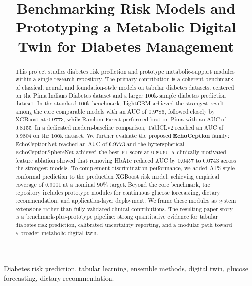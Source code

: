 \documentclass[conference]{IEEEtran}
\begin{document}
\title{Benchmarking Risk Models and Prototyping a Metabolic Digital Twin for Diabetes Management}

\author{
}

\maketitle

\begin{abstract}
This project studies diabetes risk prediction and prototype metabolic-support modules within a single research repository. The primary contribution is a coherent benchmark of classical, neural, and foundation-style models on tabular diabetes datasets, centered on the Pima Indians Diabetes dataset and a larger 100k-sample diabetes prediction dataset. In the standard 100k benchmark, LightGBM achieved the strongest result among the core comparable models with an AUC of 0.9786, followed closely by XGBoost at 0.9773, while Random Forest performed best on Pima with an AUC of 0.8155. In a dedicated modern-baseline comparison, TabICLv2 reached an AUC of 0.9804 on the 100k dataset. We further evaluate the proposed \textbf{EchoCeption} family: EchoCeptionNet reached an AUC of 0.9773 and the hyperspherical EchoCeptionSphereNet achieved the best F1 score at 0.8030. A clinically motivated feature ablation showed that removing HbA1c reduced AUC by 0.0457 to 0.0743 across the strongest models. To complement discrimination performance, we added APS-style conformal prediction to the production XGBoost risk model, achieving empirical coverage of 0.9001 at a nominal 90\% target. Beyond the core benchmark, the repository includes prototype modules for continuous glucose forecasting, dietary recommendation, and application-layer deployment. We frame these modules as system extensions rather than fully validated clinical contributions. The resulting paper story is a benchmark-plus-prototype pipeline: strong quantitative evidence for tabular diabetes risk prediction, calibrated uncertainty reporting, and a modular path toward a broader metabolic digital twin.
\end{abstract}

\begin{IEEEkeywords}
Diabetes risk prediction, tabular learning, ensemble methods, digital twin, glucose forecasting, dietary recommendation.
\end{IEEEkeywords}
\end{document}

